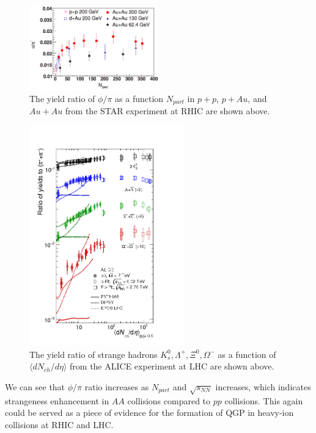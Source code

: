 \begin{figure}[hbtp]
\begin{center}
\includegraphics[width=0.50\textwidth]{Figures/Chapter1/STARPhiOverPi.png}
\caption{The yield ratio of $\phi/\pi$ as a function $N_{part}$ in $p + p$, $p + Au$, and $Au + Au$ from the STAR experiment at RHIC are shown above.}
\label{PhiRAA1}
\end{center}
\end{figure}   

\begin{figure}[hbtp]
\begin{center}
\includegraphics[width=0.60\textwidth]{Figures/Chapter1/ALICEStrange.png}
\caption{The yield ratio of strange hadrons $K^0_s, \Lambda^+, \Xi^0, \Omega^-$ as a function of $\langle dN_{ch}/d\eta \rangle$ from the ALICE experiment at LHC are shown above.}
\label{PhiRAA2}
\end{center}
\end{figure}   

We can see that $\phi/\pi$ ratio increases as $N_{part}$ and $\sqrt {s_{NN}}$ increases, which indicates strangeness enhancement in $AA$ collisions compared to $pp$ collisions. This again could be served as a piece of evidence for the formation of QGP in heavy-ion collisions at RHIC and LHC. 


